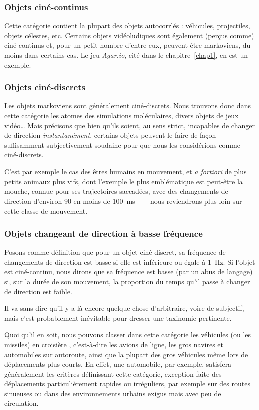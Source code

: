 	\FloatBarrier \subsubsection{Objets ciné-continus}
	Cette catégorie contient la plupart des objets autocorrlés : véhicules, projectiles, objets célestes, etc. Certains objets vidéoludiques sont également (perçus comme) ciné-continus et, pour un petit nombre d'entre eux, peuvent être markoviens, du moins dans certains cas. Le jeu \emph{Agar.io}, cité dans le chapitre~\ref{chap1}, en est un exemple.
	
	\FloatBarrier \subsubsection{Objets ciné-discrets}
	Les objets markoviens sont généralement ciné-discrets. Nous trouvons donc dans cette catégorie les atomes des simulations moléculaires, divers objets de jeux vidéo\ldots{} Mais précisons que bien qu'ils soient, au sens strict, incapables de changer de direction \emph{instantanément}, certains objets peuvent le faire de façon suffisamment subjectivement soudaine pour que nous les considérions comme ciné-discrets.
	
	C'est par exemple le cas des êtres humains en mouvement, et \emph{a fortiori} de plus petits animaux plus vifs, dont l'exemple le plus emblématique est peut-être la mouche, connue pour ses trajectoires saccadées, avec des changements de direction d'environ 90\textdegree{} en moins de 100~ms~\cite{tammero2002influence, collett1975visual, wagner1986flight, schilstra1999blowfly} --- nous reviendrons plus loin sur cette classe de mouvement.
	
	\FloatBarrier \subsubsection{Objets changeant de direction à basse fréquence}
	Posons comme définition que pour un objet ciné-discret, sa fréquence de changements de direction est \og basse \fg{} si elle est inférieure ou égale à 1~Hz. Si l'objet est ciné-continu, nous dirons que sa fréquence est basse (par un abus de langage) si, sur la durée de son mouvement, la proportion du temps qu'il passe à changer de direction est faible.
	
	Il va sans dire qu'il y a là encore quelque chose d'arbitraire, voire de subjectif, mais c'est probablement inévitable pour dresser une taxinomie pertinente.
	
	Quoi qu'il en soit, nous pouvons classer dans cette catégorie les véhicules (ou les missiles) \og en croisière \fg{}, c'est-à-dire les avions de ligne, les gros navires et automobiles sur autoroute, ainsi que la plupart des gros véhicules même lors de déplacements plus courts. En effet, une automobile, par exemple, satisfera généralement les critères définissant cette catégorie, exception faite des déplacements particulièrement rapides ou irréguliers, par exemple sur des routes sinueuses ou dans des environnements urbains exigus mais avec peu de circulation.
	
